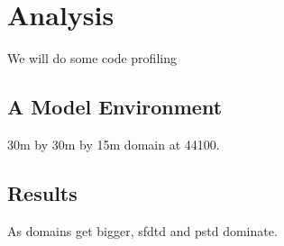 %
%
%
\chapter{Analysis}
\label{Introduction}
We will do some code profiling  

\section{A Model Environment}

30m by 30m by 15m domain at 44100.

\section{Results}

As domains get bigger, sfdtd and pstd dominate.



